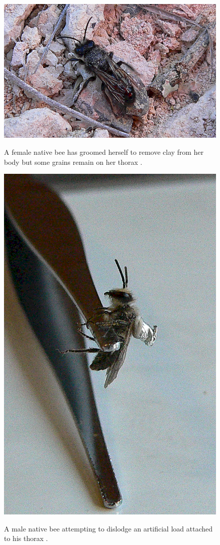 \begin{figure}[!htbp]
\myfloatalign
{\includegraphics[width=.95\linewidth]{gfx2/bee_dust}} \\
\caption[Female native bee grooming dirt from her body.]{A female native bee has groomed herself to remove clay from her body but some grains remain on her thorax \cite[pg.78]{Hart2007}.}\label{fig:dust}
\end{figure}

\begin{figure}[!htbp]
\myfloatalign
{\includegraphics[width=.55\linewidth]{gfx2/bee_load}} \\ 
\caption[Male native bee dislodging load.]{A male native bee attempting to dislodge an artificial load attached to his thorax \cite[pg.78]{Hart2007}.}
\label{fig:track}
\end{figure}

